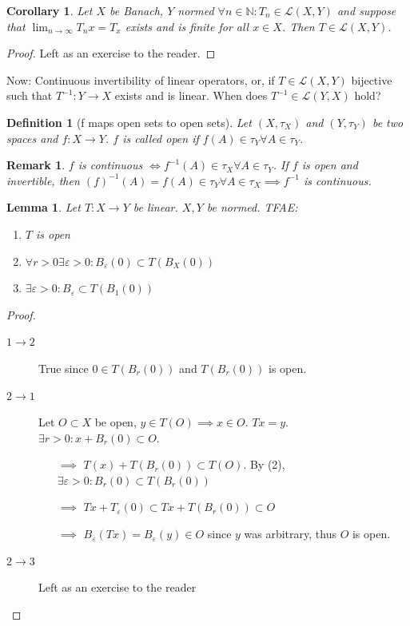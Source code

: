 \documentclass[a4paper]{article}
\newcounter{lecref}[section]
\numberwithin{lecref}{section}
\newtheorem{definition}[lecref]{Definition}
\newtheorem{lemma}[lecref]{Lemma}
\newtheorem*{Remark}{Remark}
\newtheorem{corollary}[lecref]{Corollary}
\begin{document}
\begin{corollary}
	\label{theorem:5.2}
	Let $X$ be Banach, $Y$ normed $\forall n \in \mathbb N: T_n \in \mathcal L(X, Y)$ and suppose that $\lim_{n \to \infty} T_n x = T_x$ exists and is finite for all $x \in X$. Then $T \in \mathcal L(X, Y)$.
\end{corollary}

\begin{proof}
	Left as an exercise to the reader.
\end{proof}

Now: Continuous invertibility of linear operators, or, if $T \in \mathcal L(X, Y)$ bijective such that $T^{-1}: Y \to X$ exists and is linear. When does $T^{-1} \in \mathcal L(Y, X)$ hold?

\begin{definition}[f maps open sets to open sets]
	\label{definition:5.3}
	Let $(X, \tau_X)$ and $(Y, \tau_Y)$ be two spaces and $f: X \to Y$. $f$ is called \emph{open} if $f(A) \in \tau_Y \forall A \in \tau_Y$.
\end{definition}

\begin{Remark}
	$f$ is continuous $\iff f^{-1}(A) \in \tau_X \forall A \in \tau_Y$. If $f$ is open and invertible, then $(f)^{-1}(A) = f(A) \in \tau_Y \forall A \in \tau_X \implies f^{-1}$ is continuous.
\end{Remark}

\begin{lemma}
	\label{lemma:5.4}
	Let $T: X \to Y$ be linear. $X, Y$ be normed. TFAE:
	\begin{enumerate}
		\item $T$ is open
		\item $\forall r > 0 \exists \varepsilon > 0: B_\varepsilon(0) \subset T(B_X(0))$
		\item $\exists \varepsilon > 0: B_{\varepsilon} \subset T(B_1(0))$
	\end{enumerate}
\end{lemma}

\begin{proof}
	\begin{description}
		\item[$1 \to 2$]
			True since $0 \in T(B_r(0))$ and $T(B_r(0))$ is open.
		\item[$2 \to 1$]
			Let $O \subset X$ be open, $y \in T(O) \implies x \in O$. $Tx = y$. $\exists r > 0: x + B_r(0) \subset O$.
			\begin{itemize}
				\item[$\implies$] $T(x) + T(B_r(0)) \subset T(O)$. By (2), $\exists \varepsilon > 0: B_r(0) \subset T(B_r(0))$
				\item[$\implies$] $Tx + T_\varepsilon(0) \subset Tx + T(B_r(0)) \subset O$
				\item[$\implies$] $B_\varepsilon(Tx) = B_\varepsilon(y) \in O$ since $y$ was arbitrary, thus $O$ is open.
			\end{itemize}
		\item[$2 \to 3$] Left as an exercise to the reader
	\end{description}
\end{proof}
\end{document}
